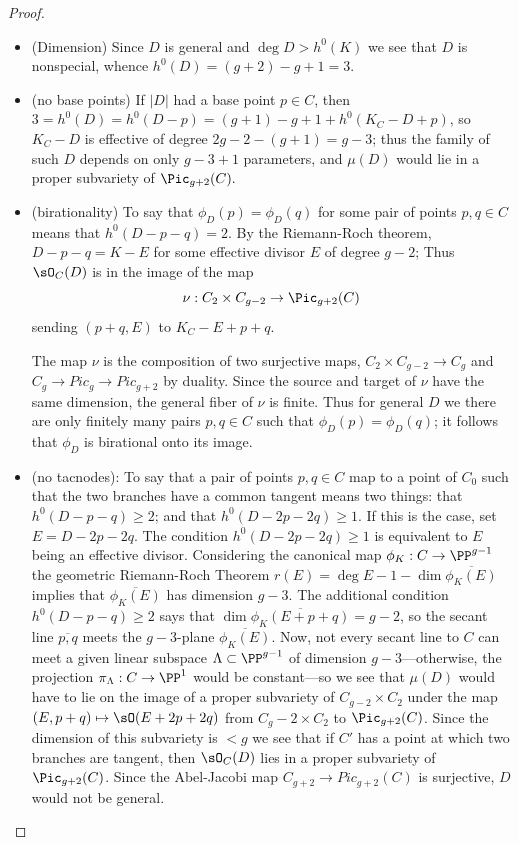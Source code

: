 \begin{proof}
\begin{itemize}

\item (Dimension) Since $D$ is general and $\deg D > h^{0}(K)$ we see that $D$ is nonspecial, whence $h^0(D) = (g+2)-g+1 = 3.$

\item (no base points) If $|D|$ had a base point $p\in C$, then $3=h^0(D) = h^0(D-p) = (g+1)-g+1+h^0(K_C-D+p)$,
so $K_C-D$ is effective of degree $2g-2-(g+1) =g-3$; thus the family of such $D$ depends on only $g-3+1$ parameters,
and $\mu(D)$ would lie in a proper subvariety of $\Pic_{g+2}(C).$

\item (birationality)
 To say that $\phi_D(p) = \phi_D(q)$ for some pair of points $p, q \in C$   means that $h^0(D-p-q) = 2$. By the Riemann-Roch
 theorem, $D-p-q = K-E$ for some effective divisor $E$ of degree $g-2$; Thus $\sO_C(D)$ is in the image of the map
$$
\nu : C_2 \times C_{g-2} \to \Pic_{g+2}(C)
$$
sending $(p+q, E)$ to $K_C - E + p + q$. 

The map $\nu$ is 
the composition of two surjective maps, $C_2 \times C_{g-2} \to C_g$ and $C_g\to Pic_g \to Pic_{g+2}$ by duality. Since the source and target of $\nu$ have the same dimension, the general fiber of $\nu$ is finite. Thus for general $D$ we  there are only finitely many pairs $p, q \in C$ such that $\phi_D(p) = \phi_D(q)$; it follows that $\phi_D$ is birational onto its image.


\item (no tacnodes):  To say that a pair of points $p, q \in C$ map to a point of $C_0$ such that the 
two branches have a common tangent means two things: that $h^0(D-p-q) \geq 2$; and that $h^0(D-2p-2q) \geq 1$. If this is the case, set $E = D - 2p - 2q$.  The condition $h^0(D-2p-2q) \geq 1$ is equivalent to  $E$ being an effective divisor. Considering the canonical map $\phi_K: C\to \PP^{g-1}$ 
the geometric Riemann-Roch Theorem $r(E) = \deg E -1-\dim\overline{\phi_K(E)}$ implies that $\overline {\phi_K(E)}$ has dimension $g-3$. The additional condition $h^0(D-p-q) \geq 2$ says that $\dim\overline{\phi_K(E+p+q)} = g-2$,
so the secant line $\overline{p,q}$ meets the $g-3$-plane $\overline{\phi_K(E)}$. Now, not every secant line to $C$ can meet a given linear subspace $\Lambda \subset \PP^{g-1}$ of dimension $g-3$---otherwise, the projection $\pi_\Lambda : C \to \PP^1$ would be constant---so we see that $\mu(D)$ would have to lie on the image of a proper subvariety of $C_{g-2} \times C_2$ under the map $(E, p+q) \mapsto \sO(E+2p+2q)$ from $C_g-2 \times C_2$ to $\Pic_{g+2}(C)$.
Since the dimension of this subvariety is $<g$ we see that if $C'$ has
a point at which two branches are tangent, then $\sO_C(D)$ lies in a proper subvariety of $\Pic_{g+2}(C)$. Since
the Abel-Jacobi map $C_{g+2} \to Pic_{g+2}(C)$ is surjective,
 $D$ would not be general. 
 


\end{itemize}
\end{proof}
